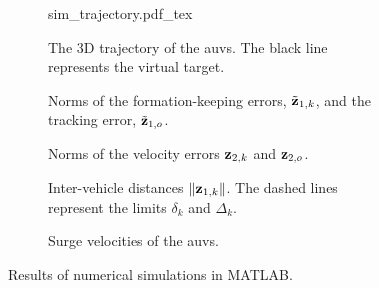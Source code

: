 \begin{figure}[p]
    \centering
    \begin{subfigure}{0.7\textwidth}
        \centering
        \def\svgwidth{\textwidth}
        {sim_trajectory.pdf_tex}
        \caption{The 3D trajectory of the \glspl{auv}. The black line represents the virtual target.}
        \label{fig:handpos_tracking_trajectory}
    \end{subfigure}  
    \begin{subfigure}{0.47\textwidth}
        
        \caption{Norms of the formation-keeping errors, $\tilde{\mathbf{z}}_{1, k}$, and the tracking error, $\tilde{\mathbf{z}}_{1, o}$.}
        \label{fig:handpos_tracking_formation_errors}
    \end{subfigure}
    \begin{subfigure}{0.47\textwidth}
        
        \caption{Norms of the velocity errors $\mathbf{z}_{2, k}$ and $\mathbf{z}_{2, o}$.}
        \label{fig:handpos_tracking_velocity_errors}
    \end{subfigure}
    \begin{subfigure}{0.47\textwidth}
        
        \caption{Inter-vehicle distances $\left\|\mathbf{z}_{1, k}\right\|$. The dashed lines represent the limits $\delta_k$ and $\Delta_k$.}
        \label{fig:handpos_tracking_distances}
    \end{subfigure}
    \begin{subfigure}{0.47\textwidth}
        
        \caption{Surge velocities of the \glspl{auv}.}
        \label{fig:handpos_tracking_surge}
    \end{subfigure}
    \caption{Results of numerical simulations in MATLAB.}
    \label{fig:handpos_tracking_sim}
\end{figure}
